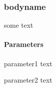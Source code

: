 \subsubsection{bodyname}
some text\paragraph{Parameters}
\begin{description}
 \item{parameter1} text
 \item{parameter2} text
\end{description}


